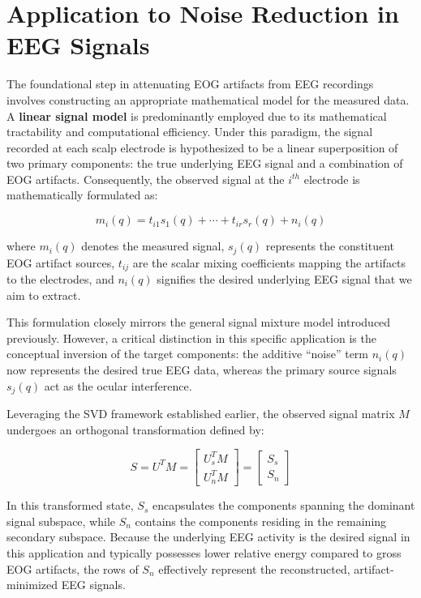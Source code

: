 \documentclass[17pt,a4paper]{extarticle}
\begin{document}
\section{Application to Noise Reduction in EEG Signals}

The foundational step in attenuating EOG artifacts from EEG recordings involves
constructing an appropriate mathematical model for the measured data. A \textbf{linear
signal model} is predominantly employed due to its mathematical tractability and
computational efficiency. Under this paradigm, the signal recorded at each scalp
electrode is hypothesized to be a linear superposition of two primary components:
the true underlying EEG signal and a combination of EOG artifacts. Consequently,
the observed signal at the $i^{th}$ electrode is mathematically formulated as:

\[
m_i(q) = t_{i1}s_1(q) + \cdots + t_{ir}s_r(q) + n_i(q)
\]

where $m_i(q)$ denotes the measured signal, $s_j(q)$ represents the constituent EOG
artifact sources, $t_{ij}$ are the scalar mixing coefficients mapping the artifacts to the
electrodes, and $n_i(q)$ signifies the desired underlying EEG signal that we aim to
extract.

This formulation closely mirrors the general signal mixture model introduced
previously. However, a critical distinction in this specific application is the conceptual
inversion of the target components: the additive ``noise'' term $n_i(q)$ now represents
the desired true EEG data, whereas the primary source signals $s_j(q)$ act as the
ocular interference.

Leveraging the SVD framework established earlier, the observed signal matrix $M$
undergoes an orthogonal transformation defined by:

\[
S = U^T M =
\begin{bmatrix}
U_s^T M \\
U_n^T M
\end{bmatrix}
=
\begin{bmatrix}
S_s \\
S_n
\end{bmatrix}
\]

In this transformed state, $S_s$ encapsulates the components spanning the dominant
signal subspace, while $S_n$ contains the components residing in the remaining
secondary subspace. Because the underlying EEG activity is the desired signal in
this application and typically possesses lower relative energy compared to gross
EOG artifacts, the rows of $S_n$ effectively represent the reconstructed, artifact-
minimized EEG signals.
\end{document}
